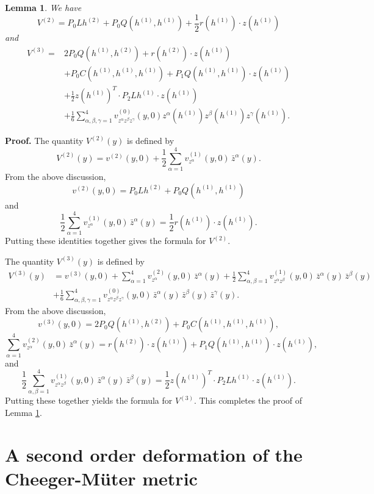\documentclass[11pt]{amsart}
\newtheorem{lemma}[theorem]{Lemma}
\theoremstyle{definition}
\begin{document}
\begin{lemma}\label{Vk.formula}
We have
\[ V^{(2)}=P_0Lh^{(2)}+P_0Q(h^{(1)},h^{(1)})+\frac{1}{2}r(h^{(1)}) \cdot z (h^{(1)})\] 
and 
\begin{align*}
V^{(3)}=&2P_0Q(h^{(1)},h^{(2)})+r(h^{(2)})\cdot z(h^{(1)})\\
&+P_0C(h^{(1)},h^{(1)},h^{(1)})+P_1Q(h^{(1)},h^{(1)})\cdot z(h^{(1)})\\
&+\frac{1}{2}  z(h^{(1)})^T\cdot P_2Lh^{(1)}\cdot z(h^{(1)})\\
&+\frac{1}{6}\sum_{\alpha,\beta,\gamma=1}^4 v^{(0)}_{z^\alpha z^\beta z^\gamma}(y,0) z^{\alpha}(h^{(1)})z^{\beta}(h^{(1)})z^{\gamma}(h^{(1)}).
\end{align*}
\end{lemma}

\textbf{Proof.}
The quantity $V^{(2)}(y)$ is defined by
\[V^{(2)}(y) = v^{(2)}(y,0) + \frac{1}{2} \sum_{\alpha=1}^4 v^{(1)}_{z^\alpha}(y,0) \, \bar{z}^\alpha(y).\] 
From the above discussion,
\[v^{(2)}(y,0)=P_0Lh^{(2)}+P_0Q(h^{(1)},h^{(1)})\]
and
\[\frac{1}{2} \sum_{\alpha=1}^4 v^{(1)}_{z^\alpha}(y,0) \, \bar{z}^\alpha(y)=\frac{1}{2} r(h^{(1)})\cdot z(h^{(1)}).\]
Putting these identities together gives the formula for $V^{(2)}$.

The quantity $V^{(3)}(y)$ is defined by
\begin{align*} 
V^{(3)}(y) 
&= v^{(3)}(y,0) + \sum_{\alpha=1}^4 v^{(2)}_{z^\alpha}(y,0) \, \bar{z}^\alpha(y) + \frac{1}{2} \sum_{\alpha,\beta=1}^4 v^{(1)}_{z^\alpha z^\beta}(y,0) \, \bar{z}^\alpha(y) \, \bar{z}^\beta(y) \\ 
&+ \frac{1}{6} \sum_{\alpha,\beta,\gamma=1}^4 v^{(0)}_{z^\alpha z^\beta z^\gamma}(y,0) \, \bar{z}^\alpha(y) \, \bar{z}^\beta(y) \, \bar{z}^\gamma(y). 
\end{align*}
From the above discussion,
\[v^{(3)}(y,0)=2P_0Q(h^{(1)},h^{(2)})+P_0C(h^{(1)},h^{(1)},h^{(1)}),\]
\[\sum_{\alpha=1}^4 v^{(2)}_{z^\alpha}(y,0) \, \bar{z}^\alpha(y)= r(h^{(2)})\cdot z(h^{(1)})+P_1Q(h^{(1)},h^{(1)})\cdot z(h^{(1)}),\]
and
\[\frac{1}{2} \sum_{\alpha,\beta=1}^4 v^{(1)}_{z^\alpha z^\beta}(y,0) \, \bar{z}^\alpha(y) \, \bar{z}^\beta(y)= \frac{1}{2}  z(h^{(1)})^T\cdot P_2Lh^{(1)}\cdot z(h^{(1)}).\]
Putting these together yields the formula for $V^{(3)}$. This completes the proof of Lemma \ref{Vk.formula}. \\


\section{A second order deformation of the Cheeger-M\"uter metric}
\end{document}
